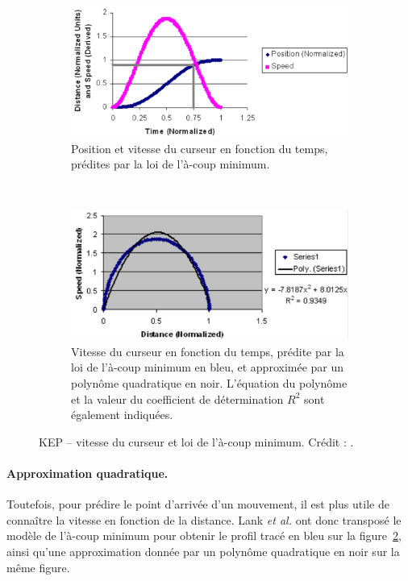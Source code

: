 	\begin{figure}[!htb]
		\begin{subfigure}[t]{0.49\textwidth}
			\centering
			\includegraphics[width=\textwidth]{figures/ch2/kepPS}
			\caption{Position et vitesse du curseur en fonction du temps, prédites par la loi de l'à-coup minimum.}
			\label{fig:kepPS}
		\end{subfigure}
		~
		\begin{subfigure}[t]{0.49\textwidth}
			\centering
			\includegraphics[width=\textwidth]{figures/ch2/kepQuad}
			\caption{Vitesse du curseur en fonction du temps, prédite par la loi de l'à-coup minimum en bleu, et approximée par un polynôme quadratique en noir. L'équation du polynôme et la valeur du coefficient de détermination $R^{2}$ sont également indiquées.}
			\label{fig:kepQuad}
		\end{subfigure}
		\caption[KEP -- vitesse du curseur et loi de l'à-coup minimum]{KEP -- vitesse du curseur et loi de l'à-coup minimum. Crédit : \cite{lank2007endpoint}.}
		\label{fig:plop}
	\end{figure}
	
	\paragraph{Approximation quadratique.}
	Toutefois, pour prédire le point d'arrivée d'un mouvement, il est plus utile de connaître la vitesse en fonction de la distance. Lank \emph{et al.} ont donc transposé le modèle de l'à-coup minimum pour obtenir le profil tracé en bleu sur la figure~\ref{fig:kepQuad}, ainsi qu'une approximation donnée par un polynôme quadratique en noir sur la même figure.
	
